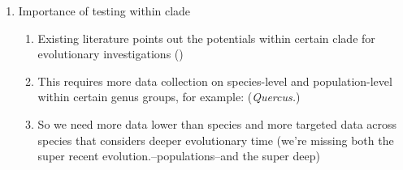 \documentclass{article}
\begin{document}
\begin{enumerate}
\item Importance of testing within clade
\begin{enumerate}
\item Existing literature points out the potentials within certain clade for evolutionary investigations (\cite{satake2021studying})
\item This requires more data collection on species-level and population-level within certain genus groups, for example: (\textit{Quercus.})
\item So we need more data lower than species and more targeted data across species that considers deeper evolutionary time (we're missing both the super recent evolution.--populations--and the super deep)
\end{enumerate}
\end{enumerate}

 
\end{document}

